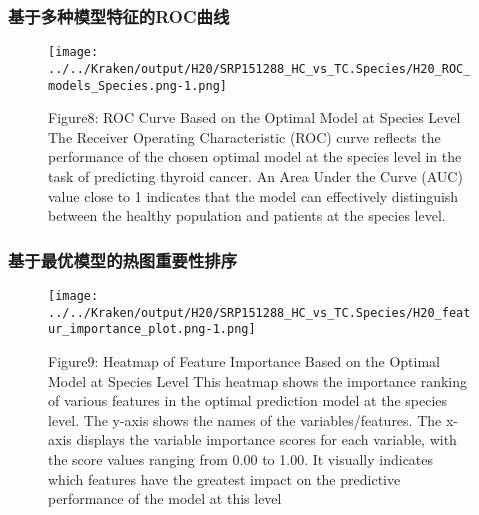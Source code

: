 \documentclass[
]{article}
\begin{document}
\subsubsection{基于多种模型特征的ROC曲线}\label{ux57faux4e8eux591aux79cdux6a21ux578bux7279ux5f81ux7684rocux66f2ux7ebf-1}

\begin{figure}
\centering
\texttt{[image: ../../Kraken/output/H20/SRP151288\_HC\_vs\_TC.Species/H20\_ROC\_models\_Species.png-1.png]}
\caption{Figure8: ROC Curve Based on the Optimal Model at Species Level
The Receiver Operating Characteristic (ROC) curve reflects the
performance of the chosen optimal model at the species level in the task
of predicting thyroid cancer. An Area Under the Curve (AUC) value close
to 1 indicates that the model can effectively distinguish between the
healthy population and patients at the species level.}
\end{figure}

\subsubsection{基于最优模型的热图重要性排序}\label{ux57faux4e8eux6700ux4f18ux6a21ux578bux7684ux70edux56feux91cdux8981ux6027ux6392ux5e8f-1}

\begin{figure}
\centering
\texttt{[image: ../../Kraken/output/H20/SRP151288\_HC\_vs\_TC.Species/H20\_featur\_importance\_plot.png-1.png]}
\caption{Figure9: Heatmap of Feature Importance Based on the Optimal
Model at Species Level This heatmap shows the importance ranking of
various features in the optimal prediction model at the species level.
The y-axis shows the names of the variables/features. The x-axis
displays the variable importance scores for each variable, with the
score values ranging from 0.00 to 1.00. It visually indicates which
features have the greatest impact on the predictive performance of the
model at this level}
\end{figure}
\end{document}
